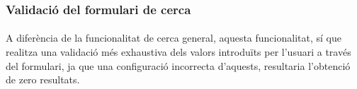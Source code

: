 \subsubsection{Validació del formulari de cerca}

\paragraph{}
A diferència de la funcionalitat de cerca general, aquesta funcionalitat, sí que realitza una validació més exhaustiva dels valors introduïts per l'usuari a través del formulari, ja que una configuració incorrecta d'aquests, resultaria l’obtenció de zero resultats.
